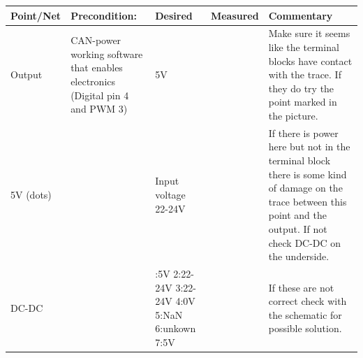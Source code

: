 \begin{table}[ht]
\begin{tabularx}{\textwidth}{|>{\hsize=0.6\hsize}X|>{\hsize=0.8\hsize}X|>{\hsize=0.8\hsize}X|c|>{\hsize=1.8\hsize}X|}
\hline
Point/Net & Precondition: & Desired & Measured & Commentary \\ 
\hline
Output & CAN-power working software that enables electronics (Digital pin 4 and PWM 3) & 5V &   & Make sure it seems like the terminal blocks have contact with the trace. If they do try the point marked in the picture. \\ 
\hline 
5V (dots) &  & Input voltage 22-24V &    & If there is power here but not in the terminal block there is some kind of damage on the trace between this point and the output. If not check DC-DC on the underside. \\ 
\hline 
DC-DC &  & 	1:5V 2:22-24V 3:22-24V 4:0V 5:NaN 6:unkown 7:5V &   & If these are not correct check with the schematic for possible solution.  \\ 
\hline 
\end{tabularx}
\end{table}

\newpage